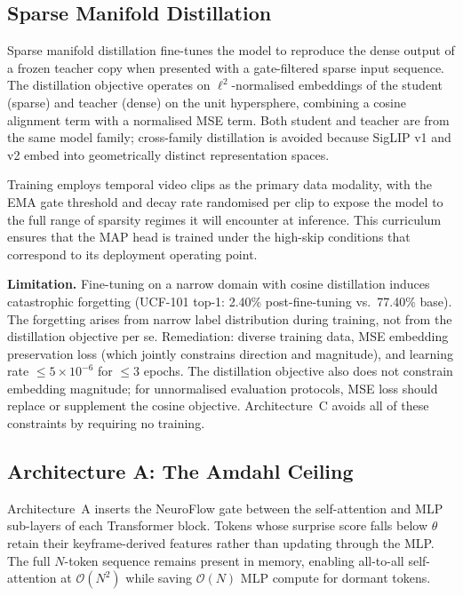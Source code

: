\documentclass{article}
\begin{document}
\subsection{Sparse Manifold Distillation}
\label{sec:distillation}

Sparse manifold distillation fine-tunes the model to reproduce the dense
output of a frozen teacher copy when presented with a gate-filtered
sparse input sequence. The distillation objective operates on
$\ell^2$-normalised embeddings of the student (sparse) and teacher
(dense) on the unit hypersphere, combining a cosine alignment term with
a normalised MSE term. Both student and teacher are from the same model
family; cross-family distillation is avoided because SigLIP v1 and v2
embed into geometrically distinct representation spaces.

Training employs temporal video clips as the primary data modality, with
the EMA gate threshold and decay rate randomised per clip to expose the
model to the full range of sparsity regimes it will encounter at
inference. This curriculum ensures that the MAP head is trained under the
high-skip conditions that correspond to its deployment operating point.

\textbf{Limitation.}
Fine-tuning on a narrow domain with cosine distillation induces
catastrophic forgetting (UCF-101 top-1: 2.40\% post-fine-tuning vs.\
77.40\% base). The forgetting arises from narrow label distribution
during training, not from the distillation objective per se.
Remediation: diverse training data, MSE embedding preservation loss
(which jointly constrains direction and magnitude), and learning rate
$\leq 5 \times 10^{-6}$ for $\leq 3$ epochs. The distillation objective
also does not constrain embedding magnitude; for unnormalised evaluation
protocols, MSE loss should replace or supplement the cosine objective.
Architecture~C avoids all of these constraints by requiring no training.

\subsection{Architecture A: The Amdahl Ceiling}
\label{sec:arch-a}


Architecture~A inserts the NeuroFlow gate between the self-attention
and MLP sub-layers of each Transformer block. Tokens whose surprise score
falls below $\theta$ retain their keyframe-derived features rather than
updating through the MLP. The full $N$-token sequence remains present in
memory, enabling all-to-all self-attention at $\mathcal{O}(N^2)$ while
saving $\mathcal{O}(N)$ MLP compute for dormant tokens.
\end{document}
